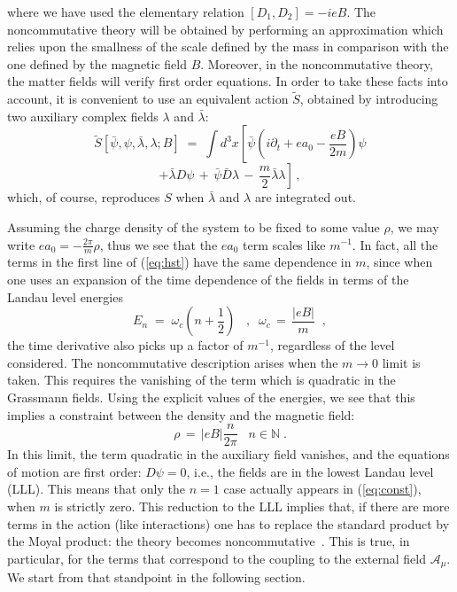 \documentclass[a4paper,12pt]{article}
\begin{document}
where we have used the elementary relation 
$[D_1, D_2] = -i e B$.
The noncommutative theory will be obtained by performing an 
approximation which relies upon the smallness of the scale defined 
by the mass in comparison with the one defined by the magnetic 
field $B$. Moreover, in the noncommutative theory, the matter 
fields will verify first order equations. In order to take 
these facts into account, it is convenient to use an equivalent 
action  ${\widetilde S}$, obtained by introducing two auxiliary 
complex fields $\lambda$ and ${\bar\lambda}$:
$$
{\widetilde S}[{\bar \psi},\psi,{\bar \lambda},\lambda;B]\;=\;\int d^3x \left[ 
{\bar\psi} \left(i  \partial_t + e a_0 - \frac{ e B}{2 m }\right)\psi \right.
$$
\begin{equation}
 \label{eq:hst}
\left. + {\bar\lambda}D \psi \,+\,  {\bar\psi}{\bar D} \lambda \,-\,
\frac{m}{2}{\bar\lambda}\lambda \right]\,,
\end{equation}
which, of course, reproduces $S$ when ${\bar\lambda}$ and $\lambda$ are 
integrated out.

Assuming the charge density of the system to be fixed to some value
$\rho$, we may write $e a_0=-\frac{2\pi }{m} \rho$, thus we see that the $e
a_0$ term scales like $m^{-1}$.  In fact, all the terms in the first
line of (\ref{eq:hst}) have the same dependence in $m$, since when one
uses an expansion of the time dependence of the fields in terms of the
Landau level energies
\begin{equation}
E_n \;=\;  \omega_c \left(n+\frac{1}{2}\right) \;\;\;,\;\; \omega_c \,=\, \frac{|e B|}{m }\;\;, 
\end{equation}
the time derivative also picks up a factor of $m^{-1}$, regardless of
the level considered. The noncommutative description arises when the
$m \to 0$ limit is taken.  This requires the vanishing of the term 
which
is quadratic in the Grassmann fields. Using the explicit values of the
energies, we see that this implies a constraint between the density
and the magnetic field:
\begin{equation}
  \label{eq:const}
\rho \,=\, |e B|\frac{n}{ 2\pi}  \;\;\; n \in {\mathbb N} \;. 
\end{equation}  
In this limit, the term quadratic in the auxiliary field vanishes, and
the equations of motion are first order: $D \psi = 0$, i.e., the fields
are in the lowest Landau level (LLL). This means that only the $n=1$
case actually appears in (\ref{eq:const}), when $m$ is strictly zero.
This reduction to the LLL implies that, if there are more terms in the
action (like interactions) one has to replace the standard product by
the Moyal product: the theory becomes noncommutative~\cite{cesarana}.
This is true, in particular, for the terms that correspond to the
coupling to the external field ${\mathcal A}_\mu$. We start from that
standpoint in the following section.
\end{document}
